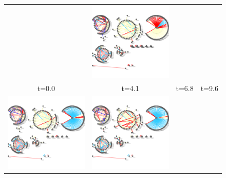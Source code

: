 \documentclass{bioinfo}
\begin{document}
\begin{figure}[htp]
\begin{tabular}{cccc}
  &   \includegraphics[scale=0.3]{results/aejoint/t4.png}  \\
   t=0.0 & t=4.1 & t=6.8 & t=9.6 \\ 
  \includegraphics[scale=0.3]{results/aejoint/t5.png}
  &   \includegraphics[scale=0.3]{results/aejoint/t6.png}

\end{tabular}
\end{figure}
\end{document}
